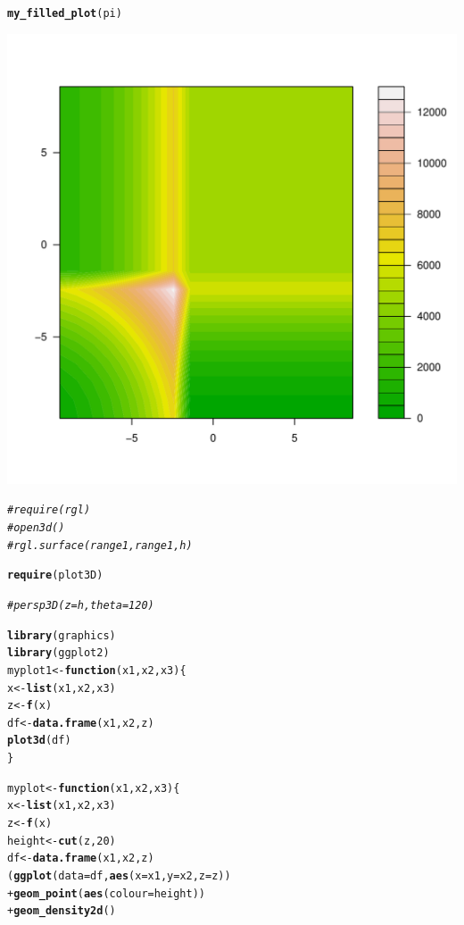 \documentclass{article}\usepackage[]{graphicx}\usepackage[]{color}
\makeatletter
\def\maxwidth{ %
  \ifdim\Gin@nat@width>\linewidth
    \linewidth
  \else
    \Gin@nat@width
  \fi
}
\newcommand{\hlnum}[1]{\textcolor[rgb]{0.686,0.059,0.569}{#1}}%
\newcommand{\hlcom}[1]{\textcolor[rgb]{0.678,0.584,0.686}{\textit{#1}}}%
\newcommand{\hlopt}[1]{\textcolor[rgb]{0,0,0}{#1}}%
\newcommand{\hlstd}[1]{\textcolor[rgb]{0.345,0.345,0.345}{#1}}%
\newcommand{\hlkwa}[1]{\textcolor[rgb]{0.161,0.373,0.58}{\textbf{#1}}}%
\newcommand{\hlkwb}[1]{\textcolor[rgb]{0.69,0.353,0.396}{#1}}%
\newcommand{\hlkwc}[1]{\textcolor[rgb]{0.333,0.667,0.333}{#1}}%
\newcommand{\hlkwd}[1]{\textcolor[rgb]{0.737,0.353,0.396}{\textbf{#1}}}%
\newenvironment{kframe}{%
 \def\at@end@of@kframe{}%
 \ifinner\ifhmode%
  \def\at@end@of@kframe{\end{minipage}}%
  \begin{minipage}{\columnwidth}%
 \fi\fi%
 \def\FrameCommand##1{\hskip\@totalleftmargin \hskip-\fboxsep
 \colorbox{shadecolor}{##1}\hskip-\fboxsep
     \hskip-\linewidth \hskip-\@totalleftmargin \hskip\columnwidth}%
 \MakeFramed {\advance\hsize-\width
   \@totalleftmargin\z@ \linewidth\hsize
   \@setminipage}}%
 {\par\unskip\endMakeFramed%
 \at@end@of@kframe}
\newenvironment{knitrout}{}{} %
\makeatother
\begin{document}
\begin{knitrout}
\begin{kframe}\begin{alltt}
\hlkwd{my_filled_plot}\hlstd{(pi)}
\end{alltt}
\end{kframe}
\includegraphics[width=\maxwidth]{figure/unnamed-chunk-4-4} 
\begin{kframe}\begin{alltt}
\hlcom{# require(rgl)}
\hlcom{# open3d()}
\hlcom{# rgl.surface(range1,range1,h)}

\hlkwd{require}\hlstd{(plot3D)}
\end{alltt}


{\ttfamily\noindent\itshape\color{messagecolor}{\#\# Loading required package: plot3D}}\begin{alltt}
\hlcom{#persp3D(z = h, theta = 120)}

\hlkwd{library}\hlstd{(graphics)}
\hlkwd{library}\hlstd{(ggplot2)}
\hlstd{myplot1} \hlkwb{<-} \hlkwa{function}\hlstd{(}\hlkwc{x1}\hlstd{,}\hlkwc{x2}\hlstd{,}\hlkwc{x3}\hlstd{)\{}
  \hlstd{x} \hlkwb{<-} \hlkwd{list}\hlstd{(x1 ,x2, x3)}
  \hlstd{z} \hlkwb{<-} \hlkwd{f}\hlstd{(x)}
  \hlstd{df} \hlkwb{<-} \hlkwd{data.frame}\hlstd{(x1,x2,z)}
  \hlkwd{plot3d}\hlstd{(df)}
  \hlstd{\}}

\hlstd{myplot} \hlkwb{<-} \hlkwa{function}\hlstd{(}\hlkwc{x1}\hlstd{,}\hlkwc{x2}\hlstd{,}\hlkwc{x3}\hlstd{)\{}
  \hlstd{x} \hlkwb{<-} \hlkwd{list}\hlstd{(x1 ,x2, x3)}
  \hlstd{z} \hlkwb{<-} \hlkwd{f}\hlstd{(x)}
  \hlstd{height} \hlkwb{<-}\hlkwd{cut}\hlstd{(z,}\hlnum{20}\hlstd{)}
  \hlstd{df} \hlkwb{<-} \hlkwd{data.frame}\hlstd{(x1,x2,z)}
  \hlstd{(}\hlkwd{ggplot}\hlstd{(}\hlkwc{data}\hlstd{=df,} \hlkwd{aes}\hlstd{(}\hlkwc{x}\hlstd{=x1,} \hlkwc{y}\hlstd{=x2,} \hlkwc{z}\hlstd{=z))}
  \hlopt{+} \hlkwd{geom_point}\hlstd{(}\hlkwd{aes}\hlstd{(}\hlkwc{colour}\hlstd{=height))}
  \hlopt{+} \hlkwd{geom_density2d}\hlstd{()}


\end{alltt}
\end{kframe}
\end{knitrout}
\end{document}
